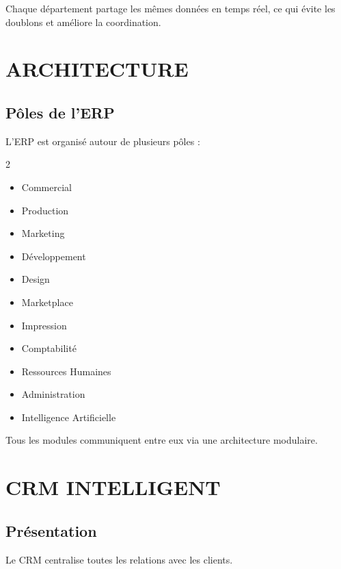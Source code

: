 \documentclass[12pt,a4paper,oneside]{book}
\begin{document}
Chaque département partage les mêmes données en temps réel, ce qui évite les doublons et améliore la coordination.

\chapter{ARCHITECTURE}

\section{Pôles de l'ERP}
L'ERP est organisé autour de plusieurs pôles :
\begin{multicols}{2}
\begin{itemize}
\item Commercial
\item Production
\item Marketing
\item Développement
\item Design
\item Marketplace
\item Impression
\item Comptabilité
\item Ressources Humaines
\item Administration
\item Intelligence Artificielle
\end{itemize}
\end{multicols}

Tous les modules communiquent entre eux via une architecture modulaire.

\chapter{CRM INTELLIGENT}

\section{Présentation}
Le CRM centralise toutes les relations avec les clients.
\end{document}
